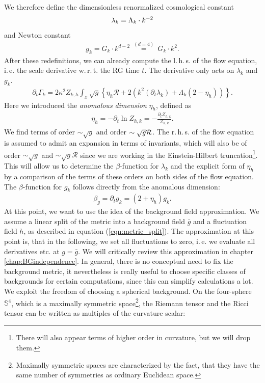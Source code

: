 We therefore define the dimensionless renormalized cosmological constant 
\begin{align}
	\lambda_k = \Lambda_k\cdot k^{-2}
\end{align}
and Newton constant
\begin{align}
	g_k = G_k\cdot k^{d-2} \ \overset{(d=4)}{=} \ G_k\cdot k^{2}.
\end{align}
After these redefinitions, we can already compute the l.\,h.\,s. of the flow equation, i.\,e. the scale derivative w.\,r.\,t. the RG time $t$. The derivative only acts on $\lambda_k$ and $g_k$.
\begin{align}
	\partial_{t}\Gamma_{k} = 2\kappa^2 Z_{k,h}\int_x \sqrt{g} \left\{\eta_h\mathcal{R}+2\left(k^2(\partial_t\lambda_k) + \Lambda_k(2 - \eta_h)\right)\right\}.
	\label{eqn:LHS}
\end{align}
Here we introduced the \textit{anomalous dimension} $\eta_h$, defined as
\begin{align}
	\eta_h=-\partial_t \ln Z_{h,k} = -\frac{\partial_tZ_{h,k}}{Z_{h,k}}.
\end{align} 
We find terms of order $\sim\sqrt{g}$ and order $\sim\sqrt{g}\mathcal{R}$. The r.\,h.\,s. of the flow equation is assumed to admit an expansion in terms of invariants, which will also be of order $\sim\sqrt{g}$ and $\sim\sqrt{g}\mathcal{R}$ since we are working in the Einstein-Hilbert truncation\footnote{There will also appear terms of higher order in curvature, but we will drop them.}. This will allow us to determine the $\beta$-function for $\lambda_k$ and the explicit form of $\eta_h$ by a comparison of the terms of these orders on both sides of the flow equation.
The $\beta$-function for $g_k$ follows directly from the anomalous dimension:
\begin{align}
	\beta_g = \partial_t g_k = \left(2 + \eta_h\right)g_k.
	\label{eqn:beta_gk}
\end{align}
At this point, we want to use the idea of the background field approximation. We assume a linear split of the metric into a background field $\bar{g}$ and a fluctuation field $h$, as described in  equation (\ref{eqn:metric_split}). The approximation at this point is, that in the following, we set all fluctuations to zero, i.\,e. we evaluate all derivatives etc. at $g=\bar{g}$. We will critically review this approximation in chapter \ref{chap:BGindependence}. In general, there is no conceptual need to fix the background metric, it nevertheless is really useful to choose specific classes of backgrounds for certain computations, since this can simplify calculations a lot. We exploit the freedom of choosing a spherical background. On the four-sphere $\mathbb{S}^4$, which is a maximally symmetric space\footnote{Maximally symmetric spaces are characterized by the fact, that they have the same number of symmetries as ordinary Euclidean space.}, the Riemann tensor and the Ricci tensor can be written as multiples of the curvature scalar:
